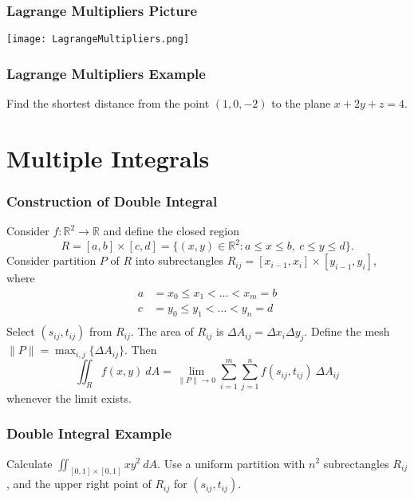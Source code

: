 \documentclass{beamer}
\begin{document}
\begin{frame}
\frametitle{Lagrange Multipliers Picture}
\begin{center}
\texttt{[image: LagrangeMultipliers.png]}
\end{center}
\end{frame}

\begin{frame}[t]
\frametitle{Lagrange Multipliers Example}
\begin{Example}
Find the shortest distance from the point $(1, 0, -2)$ to the plane $x + 2y + z = 4$.
\end{Example}
\end{frame}

\section{Multiple Integrals}

\begin{frame}
\frametitle{Construction of Double Integral}
\tiny
Consider $f:\mathbb{R}^2\to\mathbb{R}$ and define the closed region
$$
R = [a, b]\times [c, d] = \{(x, y)\in\mathbb{R}^2: a\leq x\leq b,\ c\leq y\leq d\}.
$$
Consider partition $P$ of $R$ into subrectangles $R_{ij} = [x_{i - 1}, x_i]\times [y_{i - 1}, y_i]$, where
\begin{align*}
a &= x_0 \leq x_1 < \ldots < x_m = b\\
c &= y_0 \leq y_1 < \ldots < y_n = d\\
\end{align*}
Select $(s_{ij}, t_{ij})$ from $R_{ij}$. The area of $R_{ij}$ is $\Delta A_{ij} = \Delta x_i\Delta y_j$. Define the mesh $\|P\| = \max_{i, j}\{\Delta A_{ij}\}$. Then
$$
\iint_R f(x, y)\ dA = \lim_{\|P\|\to 0} \sum_{i = 1}^m\sum_{j = 1}^n f(s_{ij}, t_{ij})\ \Delta A_{ij}
$$
whenever the limit exists.
\end{frame}

\begin{frame}[t]
\frametitle{Double Integral Example}
\begin{Example}
Calculate $\displaystyle\iint_{[0,1]\times[0, 1]} xy^2\ dA$. Use a uniform partition with $n^2$ subrectangles $R_{ij}$, and the upper right point of $R_{ij}$ for $(s_{ij}, t_{ij})$.
\end{Example}
\end{frame}
\end{document}
